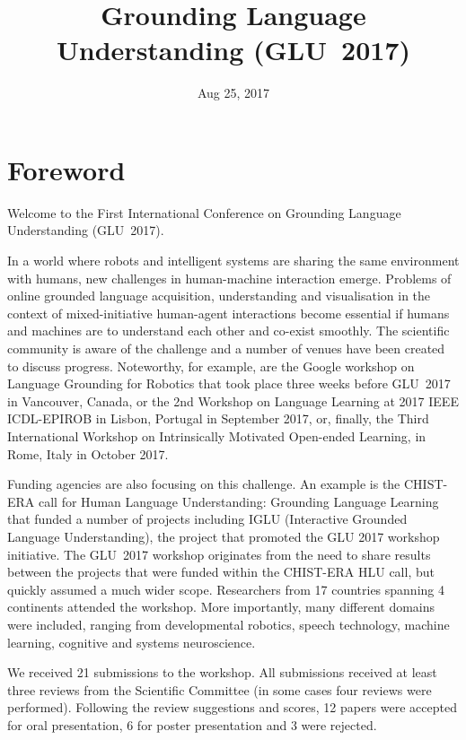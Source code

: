 \documentclass{confproc}
\title{Grounding Language Understanding (GLU~2017)}
\date{Aug 25, 2017}
\begin{document}
\pagestyle{empty}
\maketitle
\newpage
\section*{Foreword}
Welcome to the First International Conference on Grounding Language Understanding (GLU~2017).

In a world where robots and intelligent systems are sharing the same environment with humans, new challenges in human-machine interaction emerge.
Problems of online grounded language acquisition, understanding and visualisation in the context of mixed-initiative human-agent interactions become essential if humans and machines are to understand each other and co-exist smoothly.
The scientific community is aware of the challenge and a number of venues have been created to discuss progress.
Noteworthy, for example, are the Google workshop on Language Grounding for Robotics that took place three weeks before GLU~2017 in Vancouver, Canada, or the 2nd Workshop on Language Learning at 2017 IEEE ICDL-EPIROB in Lisbon, Portugal in September 2017, or, finally, the Third International Workshop on Intrinsically Motivated Open-ended Learning, in Rome, Italy in October 2017.

Funding agencies are also focusing on this challenge.
An example is the CHIST-ERA call for Human Language Understanding: Grounding Language Learning that funded a number of projects including IGLU (Interactive Grounded Language Understanding), the project that promoted the GLU 2017 workshop initiative.
The GLU~2017 workshop originates from the need to share results between the projects that were funded within the CHIST-ERA HLU call, but quickly assumed a much wider scope.
Researchers from 17 countries spanning 4 continents attended the workshop.
More importantly, many different domains were included, ranging from developmental robotics, speech technology, machine learning, cognitive and systems neuroscience.

We received 21 submissions to the workshop. All submissions received at least three reviews from the Scientific Committee (in some cases four reviews were performed). Following the review suggestions and scores, 12 papers were accepted for oral presentation, 6 for poster presentation and 3 were rejected.
\end{document}
